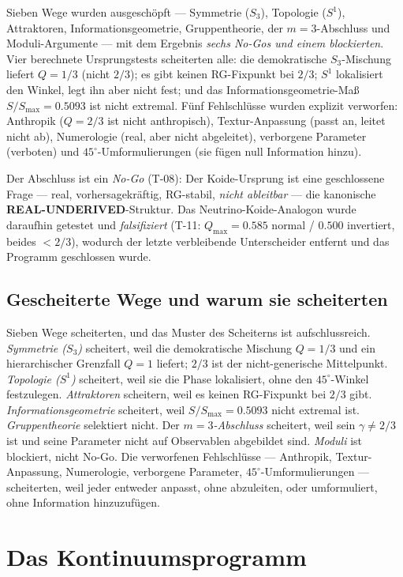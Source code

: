 \documentclass[10pt,twoside,openany]{book}
\newcommand{\realunder}{\textbf{REAL-UNDERIVED}}
\begin{document}
Sieben Wege wurden ausgeschöpft --- Symmetrie ($S_3$), Topologie ($S^1$), Attraktoren,
Informationsgeometrie, Gruppentheorie, der $m=3$-Abschluss und Moduli-Argumente --- mit
dem Ergebnis \emph{sechs No-Gos und einem blockierten}. Vier berechnete
Ursprungstests scheiterten alle: die demokratische $S_3$-Mischung liefert $Q=1/3$
(nicht $2/3$); es gibt keinen RG-Fixpunkt bei $2/3$; $S^1$ lokalisiert den Winkel, legt
ihn aber nicht fest; und das Informationsgeometrie-Maß $S/S_{\max}=0.5093$ ist nicht
extremal. Fünf Fehlschlüsse wurden explizit verworfen: Anthropik ($Q=2/3$ ist nicht
anthropisch), Textur-Anpassung (passt an, leitet nicht ab), Numerologie (real, aber nicht
abgeleitet), verborgene Parameter (verboten) und $45^\circ$-Umformulierungen (sie fügen
null Information hinzu).

Der Abschluss ist ein \emph{No-Go} (T-08): Der Koide-Ursprung ist eine geschlossene
Frage --- real, vorhersagekräftig, RG-stabil, \emph{nicht ableitbar} --- die kanonische
\realunder-Struktur. Das Neutrino-Koide-Analogon wurde daraufhin getestet und
\emph{falsifiziert} (T-11: $Q_{\max}=0.585$ normal / $0.500$ invertiert, beides
$<2/3$), wodurch der letzte verbleibende Unterscheider entfernt und das Programm
geschlossen wurde.

\subsection{Gescheiterte Wege und warum sie scheiterten}

Sieben Wege scheiterten, und das Muster des Scheiterns ist aufschlussreich.
\emph{Symmetrie ($S_3$)} scheitert, weil die demokratische Mischung $Q=1/3$ und ein
hierarchischer Grenzfall $Q=1$ liefert; $2/3$ ist der nicht-generische Mittelpunkt.
\emph{Topologie ($S^1$)} scheitert, weil sie die Phase lokalisiert, ohne den
$45^\circ$-Winkel festzulegen. \emph{Attraktoren} scheitern, weil es keinen RG-Fixpunkt
bei $2/3$ gibt. \emph{Informationsgeometrie} scheitert, weil $S/S_{\max}=0.5093$ nicht
extremal ist. \emph{Gruppentheorie} selektiert nicht. Der \emph{$m=3$-Abschluss}
scheitert, weil sein $\gamma\ne2/3$ ist und seine Parameter nicht auf Observablen
abgebildet sind. \emph{Moduli} ist blockiert, nicht No-Go. Die verworfenen Fehlschlüsse
--- Anthropik, Textur-Anpassung, Numerologie, verborgene Parameter,
$45^\circ$-Umformulierungen --- scheiterten, weil jeder entweder anpasst, ohne
abzuleiten, oder umformuliert, ohne Information hinzuzufügen.

\section{Das Kontinuumsprogramm}
\end{document}
